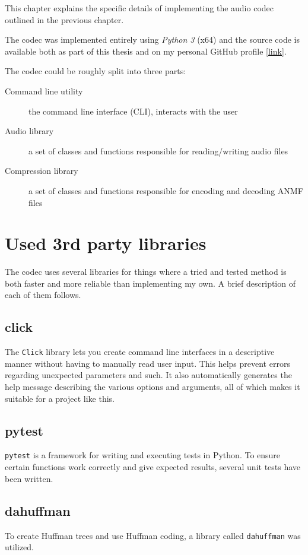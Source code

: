 This chapter explains the specific details of implementing the audio codec outlined in the previous chapter.

The codec was implemented entirely using \emph{Python 3} (x64) \cite{python3_ref} and the source code is available both as part of this thesis and on my personal GitHub profile \href{https://github.com/argoneuscze/AudioNMF}{[link]}.

The codec could be roughly split into three parts:

\begin{description}
	\item[Command line utility] the command line interface (CLI), interacts with the user
	\item[Audio library] a set of classes and functions responsible for reading/writing audio files
	\item[Compression library] a set of classes and functions responsible for encoding and decoding ANMF files
\end{description}

\section{Used 3rd party libraries}
The codec uses several libraries for things where a tried and tested method is both faster and more reliable than implementing my own. A brief description of each of them follows.

\subsection{click}
The \verb|Click| \cite{py_click} library lets you create command line interfaces in a descriptive manner without having to manually read user input. This helps prevent errors regarding unexpected parameters and such. It also automatically generates the help message describing the various options and arguments, all of which makes it suitable for a project like this.

\subsection{pytest}
\verb|pytest| \cite{py_pytest} is a framework for writing and executing tests in Python. To ensure certain functions work correctly and give expected results, several unit tests have been written.

\subsection{dahuffman}
To create Huffman trees and use Huffman coding, a library called \verb|dahuffman| \cite{py_dahuffman} was utilized.

